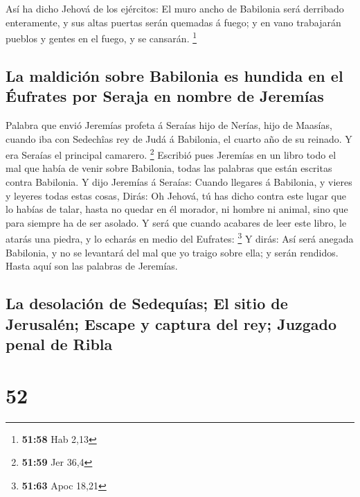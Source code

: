  Así ha dicho Jehová de los ejércitos: El muro ancho de
Babilonia será derribado enteramente, y sus altas puertas serán quemadas
á fuego; y en vano trabajarán pueblos y gentes en el fuego, y se
cansarán. \footnote{\textbf{51:58} Hab 2,13}

\hypertarget{la-maldiciuxf3n-sobre-babilonia-es-hundida-en-el-uxe9ufrates-por-seraja-en-nombre-de-jeremuxedas}{%
\subsection{La maldición sobre Babilonia es hundida en el Éufrates por
Seraja en nombre de
Jeremías}\label{la-maldiciuxf3n-sobre-babilonia-es-hundida-en-el-uxe9ufrates-por-seraja-en-nombre-de-jeremuxedas}}

 Palabra que envió Jeremías profeta á Seraías hijo de
Nerías, hijo de Maasías, cuando iba con Sedechîas rey de Judá á
Babilonia, el cuarto año de su reinado. Y era Seraías el principal
camarero. \footnote{\textbf{51:59} Jer 36,4}  Escribió
pues Jeremías en un libro todo el mal que había de venir sobre
Babilonia, todas las palabras que están escritas contra Babilonia.
 Y dijo Jeremías á Seraías: Cuando llegares á Babilonia,
y vieres y leyeres todas estas cosas,  Dirás: Oh Jehová,
tú has dicho contra este lugar que lo habías de talar, hasta no quedar
en él morador, ni hombre ni animal, sino que para siempre ha de ser
asolado.  Y será que cuando acabares de leer este libro,
le atarás una piedra, y lo echarás en medio del Eufrates: \footnote{\textbf{51:63}
  Apoc 18,21}  Y dirás: Así será anegada Babilonia, y no
se levantará del mal que yo traigo sobre ella; y serán rendidos. Hasta
aquí son las palabras de Jeremías.

\hypertarget{la-desolaciuxf3n-de-sedequuxedas-el-sitio-de-jerusaluxe9n-escape-y-captura-del-rey-juzgado-penal-de-ribla}{%
\subsection{La desolación de Sedequías; El sitio de Jerusalén; Escape y
captura del rey; Juzgado penal de
Ribla}\label{la-desolaciuxf3n-de-sedequuxedas-el-sitio-de-jerusaluxe9n-escape-y-captura-del-rey-juzgado-penal-de-ribla}}

\hypertarget{section-51}{%
\section{52}\label{section-51}}


